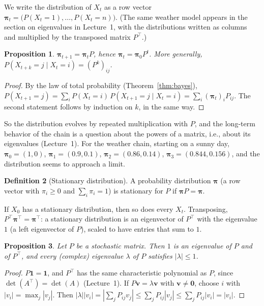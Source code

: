 \documentclass[11pt]{article}
\theoremstyle{definition}
\newtheorem{definition}{Definition}[section]
\theoremstyle{plain}
\newtheorem{proposition}[definition]{Proposition}
\theoremstyle{remark}
\begin{document}
We write the distribution of $X_t$ as a row vector $\boldsymbol{\pi}_t = \big(P(X_t = 1), \ldots, P(X_t = n)\big)$. (The same weather model appears in the section on eigenvalues in Lecture~1, with the distributions written as columns and multiplied by the transposed matrix $P^\top$.)

\begin{proposition}\label{prop:markov-evolution}
    $\boldsymbol{\pi}_{t+1} = \boldsymbol{\pi}_t P$, hence $\boldsymbol{\pi}_t = \boldsymbol{\pi}_0 P^t$. More generally, $P(X_{t+k} = j \mid X_t = i) = (P^k)_{ij}$.
\end{proposition}

\begin{proof}
    By the law of total probability (Theorem~\ref{thm:bayes}), $P(X_{t+1} = j) = \sum_i P(X_t = i)\,P(X_{t+1} = j \mid X_t = i) = \sum_i (\boldsymbol{\pi}_t)_i P_{ij}$. The second statement follows by induction on $k$, in the same way.
\end{proof}

So the distribution evolves by repeated multiplication with $P$, and the long-term behavior of the chain is a question about the powers of a matrix, i.e., about its eigenvalues (Lecture~1). For the weather chain, starting on a sunny day, $\boldsymbol{\pi}_0 = (1, 0)$, $\boldsymbol{\pi}_1 = (0.9, 0.1)$, $\boldsymbol{\pi}_2 = (0.86, 0.14)$, $\boldsymbol{\pi}_3 = (0.844, 0.156)$, and the distribution seems to approach a limit.

\begin{definition}[Stationary distribution]\label{def:stationary}
    A probability distribution $\boldsymbol{\pi}$ (a row vector with $\pi_i \geq 0$ and $\sum_i \pi_i = 1$) is stationary for $P$ if $\boldsymbol{\pi}P = \boldsymbol{\pi}$.
\end{definition}

If $X_0$ has a stationary distribution, then so does every $X_t$. Transposing, $P^\top\boldsymbol{\pi}^\top = \boldsymbol{\pi}^\top$: a stationary distribution is an eigenvector of $P^\top$ with the eigenvalue $1$ (a left eigenvector of $P$), scaled to have entries that sum to $1$.

\begin{proposition}\label{prop:stochastic-eigenvalues}
    Let $P$ be a stochastic matrix. Then $1$ is an eigenvalue of $P$ and of $P^\top$, and every (complex) eigenvalue $\lambda$ of $P$ satisfies $|\lambda| \leq 1$.
\end{proposition}

\begin{proof}
    $P\mathbf{1} = \mathbf{1}$, and $P^\top$ has the same characteristic polynomial as $P$, since $\det(A^\top) = \det(A)$ (Lecture~1). If $P\mathbf{v} = \lambda\mathbf{v}$ with $\mathbf{v} \neq \mathbf{0}$, choose $i$ with $|v_i| = \max_j |v_j|$. Then $|\lambda||v_i| = |\sum_j P_{ij}v_j| \leq \sum_j P_{ij}|v_j| \leq \sum_j P_{ij}|v_i| = |v_i|$.
\end{proof}
\end{document}
